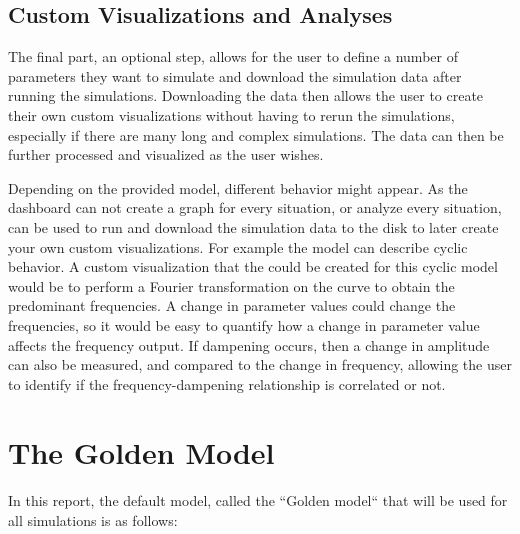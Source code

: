 \subsection{Custom Visualizations and Analyses} 
\label{sec:custom_visualization_and_framework}
The final part, an optional step, allows for the user to define a number of parameters they want to simulate and download the simulation data after running the simulations. 
Downloading the data then allows the user to create their own custom visualizations without having to rerun the simulations, especially if there are many long and complex simulations. 
The data can then be further processed and visualized as the user wishes. 

Depending on the provided model, different behavior might appear. 
As the dashboard can not create a graph for every situation, or analyze every situation,  can be used to run and download the simulation data to the disk to later create your own custom visualizations. 
For example the model can describe cyclic behavior. 
A custom visualization that the could be created for this cyclic model would be to perform a Fourier transformation on the curve to obtain the predominant frequencies. 
A change in parameter values could change the frequencies, so it would be easy to quantify how a change in parameter value affects the frequency output. 
If dampening occurs, then a change in amplitude can also be measured, and compared to the change in frequency, allowing the user to identify if the frequency-dampening relationship is correlated or not. 

\section{The Golden Model}
\label{sec:golden_model}
In this report, the default model, called the “Golden model“ \cite{gengUsingBacterialPopulation2024} that will be used for all simulations is as follows:

